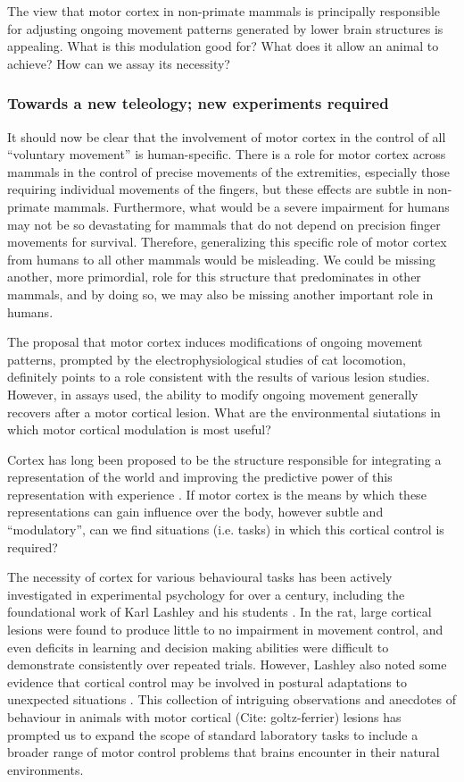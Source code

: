 The view that motor cortex in non-primate mammals is principally responsible for adjusting ongoing movement patterns generated by lower brain structures is appealing. What is this modulation good for? What does it allow an animal to achieve? How can we assay its necessity?

\subsubsection*{Towards a new teleology; new experiments required}

It should now be clear that the involvement of motor cortex in the control of all ``voluntary movement'' is human-specific. There is a role for motor cortex across mammals in the control of precise movements of the extremities, especially those requiring individual movements of the fingers, but these effects are subtle in non-primate mammals. Furthermore, what would be a severe impairment for humans may not be so devastating for mammals that do not depend on precision finger movements for survival. Therefore, generalizing this specific role of motor cortex from humans to all other mammals would be misleading. We could be missing another, more primordial, role for this structure that predominates in other mammals, and by doing so, we may also be missing another important role in humans.

The proposal that motor cortex induces modifications of ongoing movement patterns, prompted by the electrophysiological studies of cat locomotion, definitely points to a role consistent with the results of various lesion studies. However, in assays used, the ability to modify ongoing movement generally recovers after a motor cortical lesion. What are the environmental siutations in which motor cortical modulation is most useful?

Cortex has long been proposed to be the structure responsible for integrating a representation of the world and improving the predictive power of this representation with experience \cite{Barlow1985}. If motor cortex is the means by which these representations can gain influence over the body, however subtle and ``modulatory'', can we find situations (i.e. tasks) in which this cortical control is required?

The necessity of cortex for various behavioural tasks has been actively investigated in experimental psychology for over a century, including the foundational work of Karl Lashley and his students \cite{Lashley1950a}. In the rat, large cortical lesions were found to produce little to no impairment in movement control, and even deficits in learning and decision making abilities were difficult to demonstrate consistently over repeated trials. However, Lashley also noted some evidence that cortical control may be involved in postural adaptations to unexpected situations \cite{Lashley1921a}. This collection of intriguing observations and anecdotes of behaviour in animals with motor cortical (Cite: goltz-ferrier) lesions has prompted us to expand the scope of standard laboratory tasks to include a broader range of motor control problems that brains encounter in their natural environments.

